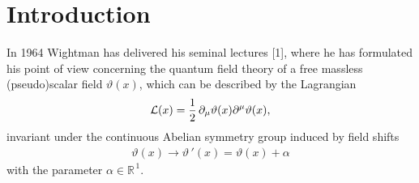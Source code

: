 \documentclass[a4paper,12pt] {article}
\begin{document}
\newpage

\section{Introduction}
\setcounter{equation}{0}

\hspace{0.2in} In 1964 Wightman has delivered his seminal lectures
[1], where he has formulated his point of view concerning the quantum
field theory of a free massless (pseudo)scalar field $\vartheta(x)$,
which can be described by the Lagrangian
%
\begin{eqnarray}\label{label1.1}
{\cal L}(x) =
\frac{1}{2}\,\partial_{\mu}\vartheta(x)\partial^{\mu}\vartheta(x),
\end{eqnarray}
%
invariant under the continuous Abelian symmetry group induced by field
shifts
%
\begin{eqnarray}\label{label1.2}
\vartheta(x) \to \vartheta\,'(x) = \vartheta(x) + \alpha
\end{eqnarray}
%
with the parameter $\alpha \in \mathbb{R}^{\,1}$. 
\end{document}
